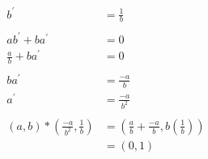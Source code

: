 \begin{enumerate}[label={\Alph*.},font={\bfseries}]
\begin{enumerate}[label={\arabic*},font={\bfseries}]
\begin{enumerate}[label={(\roman*)}]
\begin{align*}
          b^\prime &= \frac{1}{b} \\
          \\
          ab^\prime + ba^\prime &= 0 \\
          \frac{a}{b} + ba^\prime &= 0 \\
          \\
          ba^\prime &= \frac{-a}{b} \\
          a^\prime &= \frac{-a}{b^2} \\
          \\
          (a,b) * \left(\frac{-a}{b^2}, \frac{1}{b}\right) &= \left(\frac{a}{b} + \frac{-a}{b}, b\left(\frac{1}{b}\right)\right) \\
          &= (0,1)
        \end{align*}
      \end{enumerate}
    \end{enumerate}
\end{enumerate}
